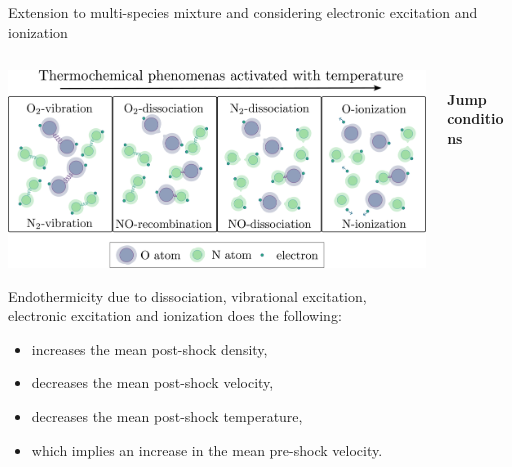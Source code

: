 \documentclass[9pt, aspectratio=1609]{beamer}
\begin{document}
\begin{frame}{\normalsize Extension to multi-species mixture and considering electronic excitation and ionization}
    \setlength{\leftmargini}{0.5em}
    \begin{columns}[c]
        \begin{column}{.45\textwidth}%
        \vspace{-0.3cm}
        \begin{center}
            \includegraphics[scale=0.085]{figures/aiaa2023/sketch_thermo.pdf}
        \end{center}
        
        Endothermicity due to dissociation, vibrational excitation, electronic excitation and ionization does the following:
        \vspace{0.3cm}
        
        \begin{itemize}
            \item increases the mean post-shock density,
            \item decreases the mean post-shock velocity,
            \item decreases the mean post-shock temperature,
            \item which implies an increase in the mean pre-shock velocity.
        \end{itemize}
        \end{column}%
        \begin{column}{.45\textwidth}
        \begin{center}
            \vspace{-0.3cm}\textbf{$\quad\quad\quad$Jump conditions}\\ \vspace{0.3cm}
            

\end{center}
\end{column}
\end{columns}
\end{frame}
\end{document}
